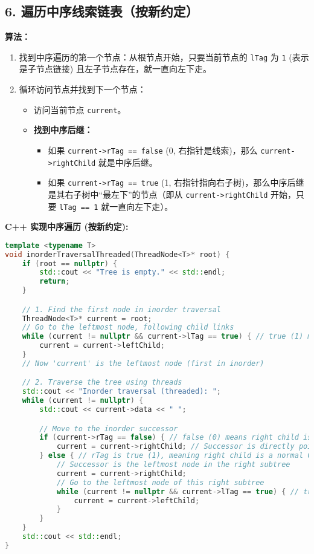 \subsection{6. 遍历中序线索链表（按新约定）}

\textbf{算法：}

\begin{enumerate}
	\item 找到中序遍历的第一个节点：从根节点开始，只要当前节点的 \lstinline{lTag} 为 \lstinline{1} (表示是子节点链接) 且左子节点存在，就一直向左下走。
	\item 循环访问节点并找到下一个节点：
	\begin{itemize}
		\item 访问当前节点 \lstinline{current}。
		\item \textbf{找到中序后继：}
		\begin{itemize}
			\item 如果 \lstinline{current->rTag == false} (0, 右指针是线索)，那么 \lstinline{current->rightChild} 就是中序后继。
			\item 如果 \lstinline{current->rTag == true} (1, 右指针指向右子树)，那么中序后继是其右子树中“最左下”的节点（即从 \lstinline{current->rightChild} 开始，只要 \lstinline{lTag == 1} 就一直向左下走）。
		\end{itemize}
	\end{itemize}
\end{enumerate}

\textbf{C++ 实现中序遍历 (按新约定):}

\begin{lstlisting}[language=C++]
template <typename T>
void inorderTraversalThreaded(ThreadNode<T>* root) {
    if (root == nullptr) {
        std::cout << "Tree is empty." << std::endl;
        return;
    }

    // 1. Find the first node in inorder traversal
    ThreadNode<T>* current = root;
    // Go to the leftmost node, following child links
    while (current != nullptr && current->lTag == true) { // true (1) means it's a child link
        current = current->leftChild;
    }
    // Now 'current' is the leftmost node (first in inorder)

    // 2. Traverse the tree using threads
    std::cout << "Inorder traversal (threaded): ";
    while (current != nullptr) {
        std::cout << current->data << " ";

        // Move to the inorder successor
        if (current->rTag == false) { // false (0) means right child is a THREAD
            current = current->rightChild; // Successor is directly pointed by the thread
        } else { // rTag is true (1), meaning right child is a normal CHILD pointer
            // Successor is the leftmost node in the right subtree
            current = current->rightChild;
            // Go to the leftmost node of this right subtree
            while (current != nullptr && current->lTag == true) { // true (1) means child link
                current = current->leftChild;
            }
        }
    }
    std::cout << std::endl;
}
\end{lstlisting}
